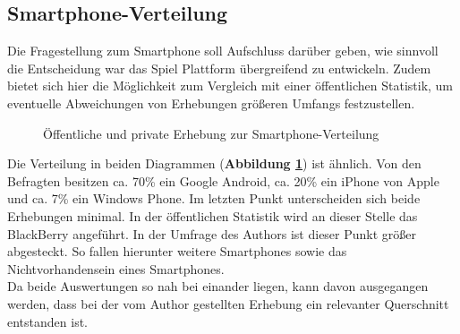 \subsection{Smartphone-Verteilung} 

Die Fragestellung zum Smartphone soll Aufschluss darüber geben, wie sinnvoll die Entscheidung war das Spiel Plattform übergreifend zu entwickeln. Zudem bietet sich hier die Möglichkeit zum Vergleich mit einer öffentlichen Statistik, um eventuelle Abweichungen von Erhebungen größeren Umfangs festzustellen.
\begin{figure}[H]
\centering
{}
\vfill
{}
\caption{Öffentliche und private Erhebung zur Smartphone-Verteilung}
\label{chart:smartphone}
\end{figure}

Die Verteilung in beiden Diagrammen (\textbf{Abbildung \ref{chart:smartphone}}) ist ähnlich. 
Von den Befragten besitzen ca. 70\% ein Google Android, ca. 20\% ein iPhone von Apple und ca. 7\% ein Windows Phone. Im letzten Punkt unterscheiden sich beide Erhebungen minimal. In der öffentlichen Statistik wird an dieser Stelle das BlackBerry angeführt. In der Umfrage des Authors ist dieser Punkt größer abgesteckt. So fallen hierunter weitere Smartphones sowie das Nichtvorhandensein eines Smartphones. \\
Da beide Auswertungen so nah bei einander liegen, kann davon ausgegangen werden, dass bei der vom Author gestellten Erhebung ein relevanter Querschnitt entstanden ist.\\


